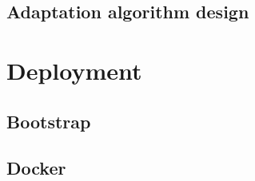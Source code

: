 \documentclass[10pt]{article}
\begin{document}
  \subsection{Adaptation algorithm design}

\section{Deployment}
  \subsection{Bootstrap}
  \subsection{Docker}
\end{document}
